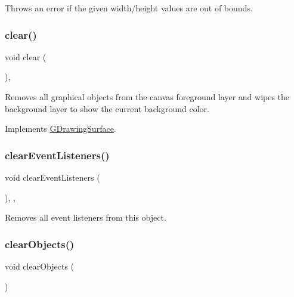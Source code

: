 Throws an error if the given width/height values are out of bounds. 

\mbox{\label{classGCanvas_aee7cb2065b88d21ac4ad05bc997ecf82}} 
\subsubsection{\texorpdfstring{clear()}{clear()}}
{\footnotesize\ttfamily void clear (\begin{DoxyParamCaption}{ }\end{DoxyParamCaption})\hspace{0.3cm}{\ttfamily [override]}, {\ttfamily [virtual]}}



Removes all graphical objects from the canvas foreground layer and wipes the background layer to show the current background color. 



Implements \mbox{\hyperlink{classGDrawingSurface_a5eeb94d22b8366d1b68d0614384802fe}{G\+Drawing\+Surface}}.

\mbox{\label{classGObservable_a80cfa040459ff53594adbd6a51ec8f43}} 
\subsubsection{\texorpdfstring{clear\+Event\+Listeners()}{clearEventListeners()}}
{\footnotesize\ttfamily void clear\+Event\+Listeners (\begin{DoxyParamCaption}{ }\end{DoxyParamCaption})\hspace{0.3cm}{\ttfamily [protected]}, {\ttfamily [virtual]}, {\ttfamily [inherited]}}



Removes all event listeners from this object. 

\mbox{\label{classGCanvas_a6614e1320bc8e93b20df129613e5a0ff}} 
\subsubsection{\texorpdfstring{clear\+Objects()}{clearObjects()}}
{\footnotesize\ttfamily void clear\+Objects (\begin{DoxyParamCaption}{ }\end{DoxyParamCaption})\hspace{0.3cm}{\ttfamily [virtual]}}



